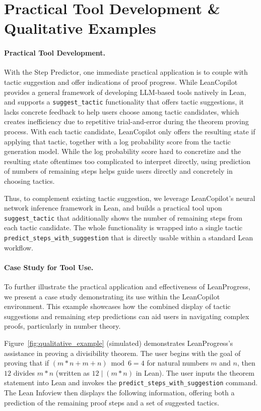 \section{Practical Tool Development \& Qualitative Examples}
\label{sec:Qualitative}

\paragraph{Practical Tool Development.}

With the Step Predictor, one immediate practical application is to couple with tactic suggestion and offer indications of proof progress. 
While LeanCopilot provides a general framework of developing LLM-based tools natively in Lean, and supports a \texttt{suggest\_tactic} functionality that offers tactic suggestions, it lacks concrete feedback to help users choose among tactic candidates, which creates inefficiency due to repetitive trial-and-error during the theorem proving process. 
With each tactic candidate, LeanCopilot only offers the resulting state if applying that tactic, together with a log probability score from the tactic generation model. 
While the log probability score hard to concretize and the resulting state oftentimes too complicated to interpret directly, using prediction of numbers of remaining steps helps guide users directly and concretely in choosing tactics.

Thus, to complement existing tactic suggestion, we leverage LeanCopilot's neural network inference framework in Lean, and builds a practical tool upon \texttt{suggest\_tactic} that additionally shows the number of remaining steps from each tactic candidate. The whole functionality is wrapped into a single tactic \texttt{predict\_steps\_with\_suggestion} that is directly usable within a standard Lean workflow.

\paragraph{Case Study for Tool Use.}

To further illustrate the practical application and effectiveness of LeanProgress, we present a case study demonstrating its use within the LeanCopilot environment. This example showcases how the combined display of tactic suggestions and remaining step predictions can aid users in navigating complex proofs, particularly in number theory.

Figure~\ref{fig:qualitative_example} (simulated) demonstrates LeanProgress's assistance in proving a divisibility theorem. The user begins with the goal of proving that if $(m * n + m + n) \bmod 6 = 4$ for natural numbers $m$ and $n$, then $12$ divides $m * n$ (written as $12 \mid (m * n)$ in Lean). The user inputs the theorem statement into Lean and invokes the \texttt{predict\_steps\_with\_suggestion} command. The Lean Infoview then displays the following information, offering both a prediction of the remaining proof steps and a set of suggested tactics. 

